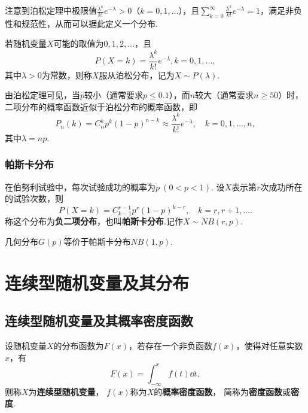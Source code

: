 注意到泊松定理中极限值\(\frac{\lambda^k}{k!} e^{-\lambda} > 0\)（\(k=0,1,\dotsc\)），且\(\sum\limits_{k=0}^{\infty} \frac{\lambda^k}{k!} e^{-\lambda} = 1\)，满足非负性和规范性，从而可以据此定义一个分布.

\begin{definition}
若随机变量\(X\)可能的取值为\(0,1,2,\dotsc\)，且\begin{equation}\label{equation:随机变量及其分布.泊松分布的分布律}
P(X=k) = \frac{\lambda^k}{k!} e^{-\lambda}, k=0,1,\dotsc,
\end{equation}其中\(\lambda > 0\)为常数，则称\(X\)服从泊松分布，记为\(X \sim P(\lambda)\).
\end{definition}

由泊松定理可见，当\(p\)较小（通常要求\(p \leqslant 0.1\)），而\(n\)较大（通常要求\(n \geqslant 50\)）时，%
二项分布的概率函数近似于泊松分布的概率函数，即\[
P_n(k) = C_n^k p^k (1-p)^{n-k} \approx \frac{\lambda^k}{k!} e^{-\lambda},
\quad k=0,1,\dotsc,n,
\]其中\(\lambda = n p\).

\subsubsection{帕斯卡分布}
\begin{definition}
在伯努利试验中，每次试验成功的概率为\(p\ (0<p<1)\).
设\(X\)表示第\(r\)次成功所在的试验次数，则\begin{equation}
P(X=k) = C_{k-1}^{r-1} p^r (1-p)^{k-r},
\quad k=r,r+1,\dotsc.
\end{equation}称这个分布为\textbf{负二项分布}，也叫\textbf{帕斯卡分布}.记作\(X \sim NB(r, p)\).

几何分布\(G(p)\)等价于帕斯卡分布\(NB(1,p)\).
\end{definition}

\section{连续型随机变量及其分布}
\subsection{连续型随机变量及其概率密度函数}
\begin{definition}
设随机变量\(X\)的分布函数为\(F(x)\)，若存在一个非负函数\(f(x)\)，使得对任意实数\(x\)，有\[
F(x) = \int_{-\infty}^x f(t) \dd{t},
\]则称\(X\)为\textbf{连续型随机变量}，%
\(f(x)\)称为\(X\)的\textbf{概率密度函数}，%
简称为\textbf{密度函数}或\textbf{密度}.
\end{definition}

